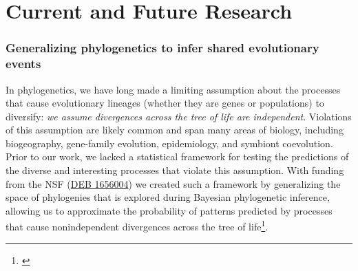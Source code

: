




\section*{Current and Future Research}


\subsubsection*{Generalizing phylogenetics to infer shared evolutionary events}
In phylogenetics, we have long made a limiting assumption about the processes
that cause evolutionary lineages (whether they are genes or populations) to
diversify: \textit{we assume divergences across the tree of life are independent}.
Violations of this assumption are likely common and span many areas of biology,
including biogeography, gene-family evolution, epidemiology, and symbiont
coevolution.
Prior to our work, we
lacked a statistical framework for testing the predictions of the
diverse and interesting processes that violate this assumption.
With funding from the NSF
(\href{https://www.nsf.gov/awardsearch/showAward?AWD_ID=1656004&HistoricalAwards=false}{DEB 1656004})
we created such a framework by generalizing the space of phylogenies that is
explored during Bayesian phylogenetic inference,
allowing us to approximate the probability
of patterns predicted by processes that cause nonindependent divergences 
across the tree of
life\footnote{\label{Oaks21phycoeval}\hspace{-0.8em}}.


